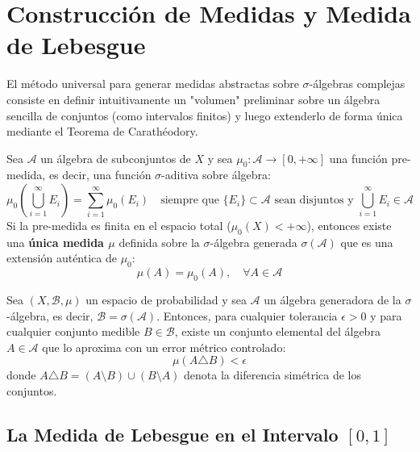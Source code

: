 \section{Construcción de Medidas y Medida de Lebesgue}

El método universal para generar medidas abstractas sobre $\sigma$-álgebras complejas consiste en definir intuitivamente un "volumen" preliminar sobre un álgebra sencilla de conjuntos (como intervalos finitos) y luego extenderlo de forma única mediante el Teorema de Carathéodory.

\begin{teorema}
	Sea $\mathcal{A}$ un álgebra de subconjuntos de $X$ y sea $\mu_0: \mathcal{A} \to [0, +\infty]$ una función pre-medida, es decir, una función $\sigma$-aditiva sobre álgebra:
	$$ \mu_0\left( \bigcup_{i=1}^\infty E_i \right) = \sum_{i=1}^\infty \mu_0(E_i) \quad \text{siempre que } \{E_i\} \subset \mathcal{A} \text{ sean disjuntos y } \bigcup_{i=1}^\infty E_i \in \mathcal{A} $$
	Si la pre-medida es finita en el espacio total ($\mu_0(X) < +\infty$), entonces existe una \textbf{única medida $\mu$} definida sobre la $\sigma$-álgebra generada $\sigma(\mathcal{A})$ que es una extensión auténtica de $\mu_0$:
	$$ \mu(A) = \mu_0(A), \quad \forall A \in \mathcal{A} $$
\end{teorema}

\begin{teorema}
	Sea $(X, \mathcal{B}, \mu)$ un espacio de probabilidad y sea $\mathcal{A}$ un álgebra generadora de la $\sigma$-álgebra, es decir, $\mathcal{B} = \sigma(\mathcal{A})$. Entonces, para cualquier tolerancia $\epsilon > 0$ y para cualquier conjunto medible $B \in \mathcal{B}$, existe un conjunto elemental del álgebra $A \in \mathcal{A}$ que lo aproxima con un error métrico controlado:
	$$ \mu(A \triangle B) < \epsilon $$
	donde $A \triangle B = (A \setminus B) \cup (B \setminus A)$ denota la diferencia simétrica de los conjuntos.
\end{teorema}

\subsection{La Medida de Lebesgue en el Intervalo \texorpdfstring{$[0,1]$}{[0,1]}}

